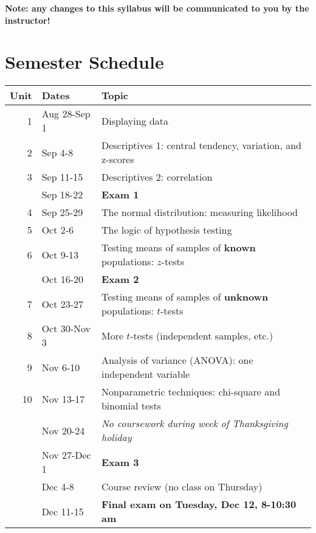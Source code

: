 \documentclass[10pt]{article}
\begin{document}
\textbf{Note:  any changes to this syllabus will be communicated to you by the instructor!}

\section*{Semester Schedule}
\label{sec-11}
\begin{center}
\begin{tabular}{rll}
Unit & Dates & Topic\\
\hline
1 & Aug 28-Sep 1 & Displaying data\\
2 & Sep 4-8 & Descriptives 1: central tendency, variation, and z-scores\\
3 & Sep 11-15 & Descriptives 2: correlation\\
 & Sep 18-22 & \textbf{Exam 1}\\
4 & Sep 25-29 & The normal distribution: measuring likelihood\\
5 & Oct 2-6 & The logic of hypothesis testing\\
6 & Oct 9-13 & Testing means of samples of \textbf{known} populations: $z$-tests\\
 & Oct 16-20 & \textbf{Exam 2}\\
7 & Oct 23-27 & Testing means of samples of \textbf{unknown} populations: $t$-tests\\
8 & Oct 30-Nov 3 & More $t$-tests (independent samples, etc.)\\
9 & Nov 6-10 & Analysis of variance (ANOVA): one independent variable\\
10 & Nov 13-17 & Nonparametric techniques: chi-square and binomial tests\\
 & Nov 20-24 & \emph{No coursework during week of Thanksgiving holiday}\\
 & Nov 27-Dec 1 & \textbf{Exam 3}\\
 & Dec 4-8 & Course review (no class on Thursday)\\
 & Dec 11-15 & \textbf{Final exam on Tuesday, Dec 12, 8-10:30 am}\\
\end{tabular}
\end{center}
\end{document}
